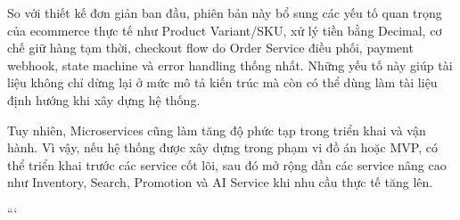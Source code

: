 So với thiết kế đơn giản ban đầu, phiên bản này bổ sung các yếu tố quan trọng của ecommerce thực tế như Product Variant/SKU, xử lý tiền bằng Decimal, cơ chế giữ hàng tạm thời, checkout flow do Order Service điều phối, payment webhook, state machine và error handling thống nhất. Những yếu tố này giúp tài liệu không chỉ dừng lại ở mức mô tả kiến trúc mà còn có thể dùng làm tài liệu định hướng khi xây dựng hệ thống.

Tuy nhiên, Microservices cũng làm tăng độ phức tạp trong triển khai và vận hành. Vì vậy, nếu hệ thống được xây dựng trong phạm vi đồ án hoặc MVP, có thể triển khai trước các service cốt lõi, sau đó mở rộng dần các service nâng cao như Inventory, Search, Promotion và AI Service khi nhu cầu thực tế tăng lên.

\clearpage
```



